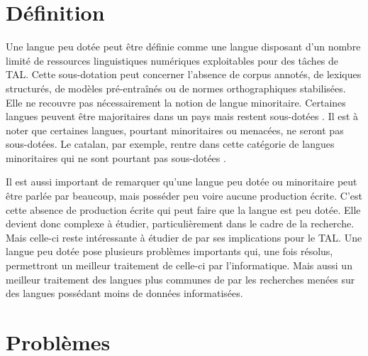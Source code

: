 \section{Définition}

Une langue peu dotée peut être définie comme une langue disposant d’un nombre limité de ressources
linguistiques numériques exploitables pour des tâches de TAL. Cette sous-dotation peut concerner l’absence
de corpus annotés, de lexiques structurés, de modèles pré-entraînés ou de normes orthographiques stabilisées.
Elle ne recouvre pas nécessairement la notion de langue minoritaire. Certaines langues peuvent être
majoritaires dans un pays mais restent sous-dotées \citep{gerken_2022}.
Il est à noter que certaines langues, pourtant minoritaires ou menacées, ne seront pas sous-dotées. Le catalan, par exemple,
rentre dans cette catégorie de langues minoritaires qui ne sont pourtant pas sous-dotées \citep{bernhard_2018}.

Il est aussi important de remarquer qu'une langue peu dotée ou minoritaire peut être parlée par beaucoup,
mais posséder peu voire aucune production écrite. C'est cette absence de production écrite qui peut faire que la langue est
peu dotée. Elle devient donc complexe à étudier, particulièrement dans le cadre de la recherche. Mais celle-ci
reste intéressante à étudier de par ses implications pour le TAL. Une langue peu dotée pose plusieurs
problèmes importants qui, une fois résolus, permettront un meilleur traitement de celle-ci par l'informatique.
Mais aussi un meilleur traitement des langues plus communes de par les recherches menées sur des langues
possédant moins de données informatisées.

\section{Problèmes} \label{problemes_peudot}

